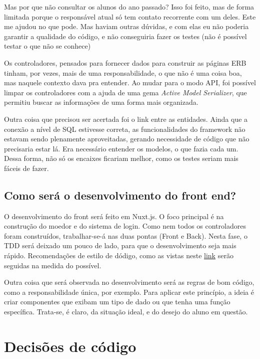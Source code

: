 Mas por que não consultar os alunos do ano passado? Isso foi feito, mas de forma limitada porque o responsável atual
só tem contato recorrente com um deles. Este me ajudou no que pode. Mas haviam outras dúvidas, e com elas eu não
poderia garantir a qualidade do código, e não conseguiria fazer os testes (não é possível testar o que não se
conhece)

Os controladores, pensados para fornecer dados para construir as páginas ERB tinham, por vezes, mais de uma
responsabilidade, o que não é uma coisa boa, mas naquele contexto dava pra entender. Ao mudar para o modo API, foi
possível limpar os controladores com a ajuda de uma gema \emph{Active Model Serializer}, que permitiu buscar as
informações de uma forma mais organizada.

Outra coisa que precisou ser acertada foi o link entre as entidades. Ainda que a conexão a nível de SQL estivesse
correta, as funcionalidades do framework não estavam sendo plenamente aproveitadas, gerando necessidade de código
que não precisaria estar lá. Era necessário entender os modelos, o que fazia cada um. Dessa forma, não só os
encaixes ficariam melhor, como os testes seriam mais fáceis de fazer.

\subsection{Como será o desenvolvimento do front end?}\label{subsec:desenvolvimento}

O desenvolvimento do front será feito em Nuxt.js. O foco principal é na construção do moedor e do sistema de login.
Como nem todos os controladores foram construídos, trabalhar-se-á nas duas pontas (Front e Back). Nesta fase, o TDD
será deixado um pouco de lado, para que o desenvolvimento seja mais rápido. Recomendações de estilo de dódigo, como
as vistas neste \href{https://br.vuejs.org/v2/style-guide/index.html}{link} serão seguidas na medida do possível.

Outra coisa que será observada no desenvolvimento será as regras de bom código, como a responsabilidade única, por
exemplo. Para aplicar este princípio, a ideia é criar componentes que exibam um tipo de dado ou que tenha uma função
específica. Trata-se, é claro, da situação ideal, e do desejo do aluno em questão.

\section{Decisões de código}\label{sec:decisoes}

